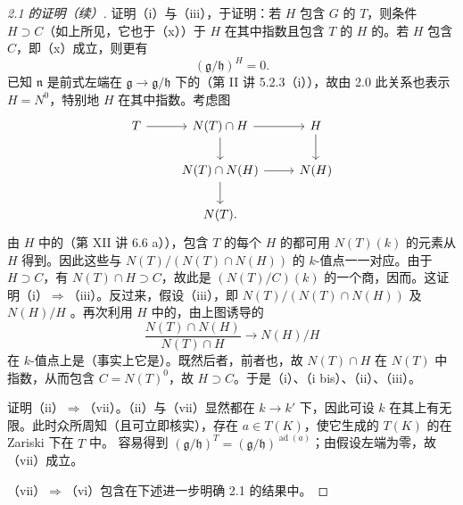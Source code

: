 \begin{proof}[ 2.1 的证明（续）]
证明（i）与（iii），于证明：若 $H$ 包含 $G$ 的 $T$，则条件 $H\supset C$（如上所见，它也于（x））于 $H$ 在其中指数且包含 $T$ 的 $H$ 的。若 $H$ 包含 $C$，即（x）成立，则更有
\[(\mathfrak g/\mathfrak h)^H=0.\tag{xx}\]
已知 $\mathfrak n$ 是前式左端在 $\mathfrak g\to\mathfrak g/\mathfrak h$ 下的（第 II 讲 5.2.3（i）），故由 2.0 此关系也表示 $H=N^0$，特别地 $H$ 在其中指数。考虑图
\[
\begin{tikzcd}
T\arrow[r]&N(T)\cap H\arrow[r]\arrow[d]&H\arrow[d]\\
&N(T)\cap N(H)\arrow[r]\arrow[d]&N(H)\\
&N(T).&
\end{tikzcd}
\]
由 $H$ 中的（第 XII 讲 6.6 a）），包含 $T$ 的每个 $H$ 的都可用 $N(T)(k)$ 的元素从 $H$ 得到。因此这些与 $N(T)/(N(T)\cap N(H))$ 的 $k$-值点一一对应。由于 $H\supset C$，有 $N(T)\cap H\supset C$，故此是 $(N(T)/C)(k)$ 的一个商，因而。这证明（i）$\Rightarrow$（iii）。反过来，假设（iii），即 $N(T)/(N(T)\cap N(H))$ 及 $N(H)/H$ 。再次利用 $H$ 中的，由上图诱导的
\[\frac{N(T)\cap N(H)}{N(T)\cap H}\longrightarrow N(H)/H\]
在 $k$-值点上是（事实上它是）。既然后者，前者也，故 $N(T)\cap H$ 在 $N(T)$ 中指数，从而包含 $C=N(T)^0$，故 $H\supset C$。于是（i）、（i bis）、（ii）、（iii）。

证明（ii）$\Rightarrow$（vii）。（ii）与（vii）显然都在 $k\to k'$ 下，因此可设 $k$ 在其上有无限。此时众所周知（且可立即核实），存在 $a\in T(K)$，使它生成的 $T(K)$ 的在 Zariski 下在 $T$ 中。
容易得到 $(\mathfrak g/\mathfrak h)^T=(\mathfrak g/\mathfrak h)^{\operatorname{ad}(a)}$；由假设左端为零，故（vii）成立。

（vii）$\Rightarrow$（vi）包含在下述进一步明确 2.1 的结果中。
\end{proof}
